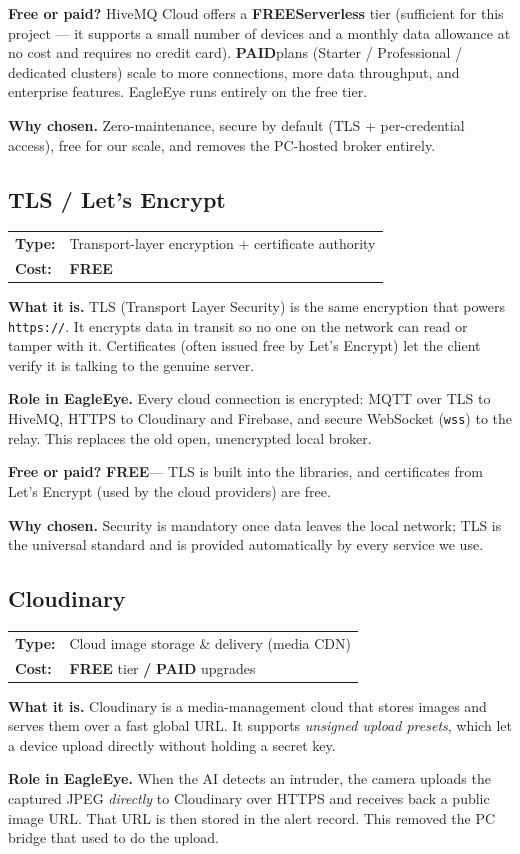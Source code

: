 \documentclass[11pt,a4paper]{article}
\makeatletter
\newcommand{\code}[1]{\texttt{#1}}
\newcommand{\free}{\textbf{\color{freegreen}FREE}}
\newcommand{\paid}{\textbf{\color{paidorange}PAID}}
\newcommand{\freepaid}{\textbf{\color{freegreen}FREE} tier \textbf{/} \textbf{\color{paidorange}PAID} upgrades}
\newcommand{\techhead}[2]{\par\vspace{0.3em}\noindent
  \begin{tabularx}{\linewidth}{@{}lX@{}}
  \textbf{Type:} & #1 \\
  \textbf{Cost:} & #2 \\
  \end{tabularx}\par\vspace{0.3em}}
\makeatother
\begin{document}
\textbf{Free or paid?} HiveMQ Cloud offers a \free \textbf{Serverless} tier (sufficient for
this project --- it supports a small number of devices and a monthly data allowance at no cost
and requires no credit card). \paid plans (Starter / Professional / dedicated clusters) scale
to more connections, more data throughput, and enterprise features. EagleEye runs entirely on
the free tier.

\textbf{Why chosen.} Zero-maintenance, secure by default (TLS + per-credential access), free
for our scale, and removes the PC-hosted broker entirely.

\subsection{TLS / Let's Encrypt}
\techhead{Transport-layer encryption + certificate authority}{\free}
\textbf{What it is.} TLS (Transport Layer Security) is the same encryption that powers
\code{https://}. It encrypts data in transit so no one on the network can read or tamper with
it. Certificates (often issued free by Let's Encrypt) let the client verify it is talking to
the genuine server.

\textbf{Role in EagleEye.} Every cloud connection is encrypted: MQTT over TLS to HiveMQ,
HTTPS to Cloudinary and Firebase, and secure WebSocket (\code{wss}) to the relay. This replaces
the old open, unencrypted local broker.

\textbf{Free or paid?} \free --- TLS is built into the libraries, and certificates from
Let's Encrypt (used by the cloud providers) are free.

\textbf{Why chosen.} Security is mandatory once data leaves the local network; TLS is the
universal standard and is provided automatically by every service we use.

\subsection{Cloudinary}
\techhead{Cloud image storage \& delivery (media CDN)}{\freepaid}
\textbf{What it is.} Cloudinary is a media-management cloud that stores images and serves them
over a fast global URL. It supports \emph{unsigned upload presets}, which let a device upload
directly without holding a secret key.

\textbf{Role in EagleEye.} When the AI detects an intruder, the camera uploads the captured
JPEG \emph{directly} to Cloudinary over HTTPS and receives back a public image URL. That URL is
then stored in the alert record. This removed the PC bridge that used to do the upload.
\end{document}

